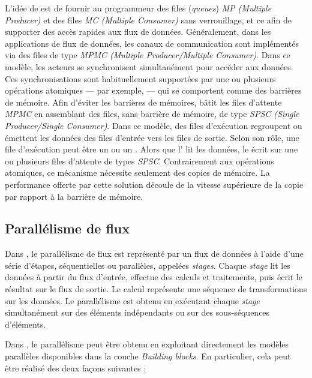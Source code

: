 L'id\'ee de  est de fournir au programmeur des files (\emph{queues}) \emph{MP (Multiple Producer)} et des files \emph{MC (Multiple Consumer)} sans verrouillage, et ce afin de supporter des acc\`es rapides aux flux de donn\'ees. G\'en\'eralement, dans les applications de flux de donn\'ees, les canaux de communication sont impl\'ementés via des files de type \emph{MPMC (Multiple Producer/Multiple Consumer)}. Dans ce modèle, les acteurs se synchronisent simultanément pour acc\'eder aux donn\'ees. Ces synchronisations sont habituellement support\'ees par une ou plusieurs op\'erations atomiques --- par exemple,  --- qui se comportent comme des barri\`eres de m\'emoire. Afin d'\'eviter les barri\`eres de m\'emoires,  b\^atit les files d'attente \emph{MPMC} en assemblant des files, sans barri\`ere de m\'emoire, de type \emph{SPSC (Single Producer/Single Consumer)}. Dans ce mod\`ele, des files d’ex\'ecution regroupent ou \'emettent les donn\'ees des files d'entr\'ee vers les files de sortie. Selon son r\^ole, une file d'ex\'ecution peut \^etre un  ou un . Alors que l' lit les donn\'ees, le  \'ecrit sur une ou plusieurs files d'attente de types \emph{SPSC}. Contrairement aux op\'erations atomiques, ce m\'ecanisme n\'ecessite seulement des copies de m\'emoire. La performance offerte par cette solution d\'ecoule de la vitesse sup\'erieure de la copie par rapport \`a la barri\`ere de m\'emoire.


\subsection{Parall\'elisme de flux}

Dans , le parall\'elisme de flux est repr\'esent\'e par un flux de donn\'ees \`a l'aide d'une s\'erie d'\'etapes, s\'equentielles ou parall\`eles, appel\'ees \emph{stages}. Chaque \emph{stage} lit les donn\'ees \`a partir du flux d'entr\'ee, effectue des calculs et traitements, puis \'ecrit le r\'esultat sur le flux de sortie. Le calcul repr\'esente une s\'equence de transformations sur les donn\'ees. Le parall\'elisme est obtenu en ex\'ecutant chaque \emph{stage} simultan\'ement sur des \'el\'ements ind\'ependants ou sur des sous-s\'equences d'\'el\'ements. 

Dans , le parall\'elisme peut \^etre obtenu en exploitant directement les mod\`eles parall\`eles disponibles dans la couche \emph{Building blocks}. En particulier, cela peut \^etre r\'ealis\'e des deux fa\c{c}ons suivantes :

